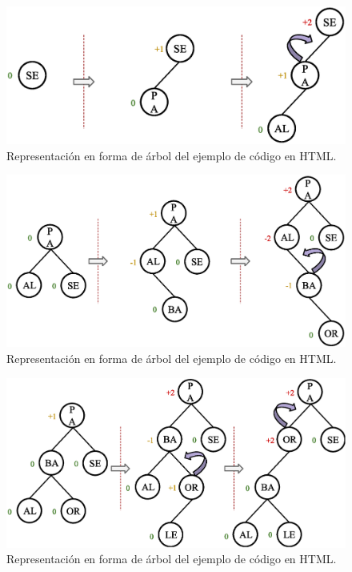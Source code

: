 \begin{figure}[htpb!]
  \begin{center}
    \includegraphics[width=1.0\textwidth]{images/AVLInsertion1.eps}
  \end{center}
  \caption{Representación en forma de árbol del ejemplo de código en HTML.}
  \label{fig:AVLInsertion1}
\end{figure}

\begin{figure}[htpb!]
  \begin{center}
    \includegraphics[width=1.0\textwidth]{images/AVLInsertion2.eps}
  \end{center}
  \caption{Representación en forma de árbol del ejemplo de código en HTML.}
  \label{fig:AVLInsertion2}
\end{figure}

\begin{figure}[htpb!]
  \begin{center}
    \includegraphics[width=1.0\textwidth]{images/AVLInsertion3.eps}
  \end{center}
  \caption{Representación en forma de árbol del ejemplo de código en HTML.}
  \label{fig:AVLInsertion3}
\end{figure}

